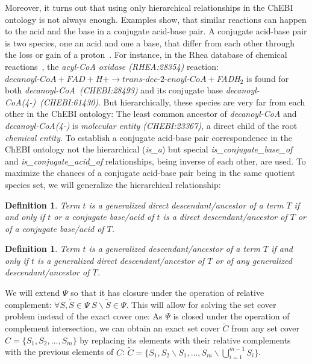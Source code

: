 \documentclass[10pt]{bmc_article}
\newenvironment{bmcformat}{\baselineskip20pt\sloppy\setboolean{publ}{false}}{\baselineskip20pt\sloppy}
\begin{document}
\begin{bmcformat}
Moreover, it turns out that using only hierarchical relationships in the ChEBI ontology is not always enough. Examples show, that similar reactions can happen to the acid and the base in a conjugate acid-base pair. A conjugate acid-base pair is two species, one an acid and one a base, that differ from each other through the loss or gain of a proton~\cite{stoker2012general}. For instance, in the Rhea database of chemical reactions~\cite{Alcantara2012}, the \textit{acyl-CoA oxidase (RHEA:28354)} reaction: $\textit{decanoyl-CoA} + \textit{FAD} + \textit{H+} \rightarrow \textit{trans-dec-2-enoyl-CoA} + $\textit{FADH$_2$} is found for both \textit{decanoyl-CoA~(CHEBI:28493)} and its conjugate base \textit{decanoyl-CoA(4-)~(CHEBI:61430)}. But hierarchically, these species are very far from each other in the ChEBI ontology: The least common ancestor of \textit{decanoyl-CoA} and \textit{decanoyl-CoA(4-)} is \textit{molecular entity (CHEBI:23367)}, a direct child of the root \textit{chemical entity}. To establish a conjugate acid-base pair correspondence in the ChEBI ontology not the hierarchical (\textit{is\_a}) but special \textit{is\_conjugate\_base\_of} and \textit{is\_conjugate\_acid\_of} relationships, being inverse of each other, are used. To maximize the chances of a conjugate acid-base pair being in the same quotient species set, we will generalize the hierarchical relationship:

\newtheorem{dirgent}[def]{Definition}
\begin{dirgent}
Term $t$ is a \emph{generalized direct descendant/ancestor} of a term $T$ if and only if $t$ or a conjugate base/acid of $t$ is a direct descendant/ancestor of $T$ or of a conjugate base/acid of $T$.
\end{dirgent} 

\newtheorem{gent}[def]{Definition}
\begin{gent}
Term $t$ is a \emph{generalized descendant/ancestor} of a term $T$ if and only if $t$ is a generalized direct descendant/ancestor of $T$ or of any generalized descendant/ancestor of $T$.
\end{gent} 

We will extend $\Psi$ so that it has closure under the operation of relative complement: $\forall S,\tilde{S} \in \Psi \; S\backslash\tilde{S} \in \Psi$. This will allow for solving the set cover problem instead of the exact cover one:  As $\Psi$ is closed under the operation of complement intersection, we can obtain an exact set cover $\tilde{C}$ from any set cover $C = \{S_1, S_2, \ldots, S_m\}$ by replacing its elements with their relative complements with the previous elements of $C$: $\tilde{C} = \{S_1, S_2 \backslash S_1, \ldots, S_m \backslash \bigcup^{m - 1}_{i = 1}{S_i}\}$.


\end{bmcformat}
\end{document}
